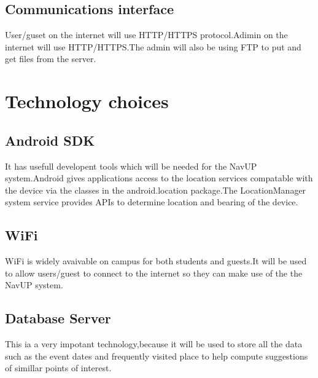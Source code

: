 \documentclass[12pt,a4paper]{article}
\begin{document}
\subsection{Communications interface}
User/guset on the internet will use HTTP/HTTPS protocol.Adimin on the internet will use HTTP/HTTPS.The admin will also be using FTP
to put and get files from the server.
\section{Technology choices}
\subsection{Android SDK}
It has usefull developent tools which will be needed for the NavUP system.Android gives applications access to the location services compatable with the device via the classes in the android.location package.The LocationManager system service provides APIs to determine location and bearing of the device.
\subsection{WiFi}
WiFi is widely avaivable on campus for both students and guests.It will be used to allow users/guest to connect to the internet so they can make use of the the NavUP system.
\subsection{Database Server}
This ia a very impotant technology,because it will be used to store all the data such as the event dates and frequently visited place to help compute suggestions of simillar points of interest.
\end{document}
